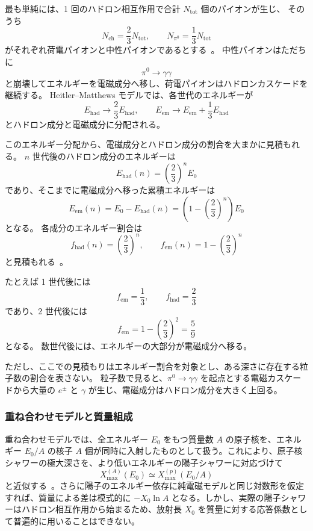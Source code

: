 \documentclass[book,paper=a4,fontsize=11pt]{jlreq}
\begin{document}
最も単純には、1 回のハドロン相互作用で合計 \(N_{\mathrm{tot}}\) 個のパイオンが生じ、
そのうち
\[
  N_{\mathrm{ch}}=\frac{2}{3}N_{\mathrm{tot}},
  \qquad
  N_{\pi^0}=\frac{1}{3}N_{\mathrm{tot}}
\]
がそれぞれ荷電パイオンと中性パイオンであるとする~\cite{Matthews2005}。
中性パイオンはただちに
\[
  \pi^0\to \gamma\gamma
\]
と崩壊してエネルギーを電磁成分へ移し、荷電パイオンはハドロンカスケードを継続する。
Heitler--Matthews モデルでは、各世代のエネルギーが
\[
  E_{\mathrm{had}}\to \frac{2}{3}E_{\mathrm{had}},
  \qquad
  E_{\mathrm{em}}\to E_{\mathrm{em}}+\frac{1}{3}E_{\mathrm{had}}
\]
とハドロン成分と電磁成分に分配される。

このエネルギー分配から、電磁成分とハドロン成分の割合を大まかに見積もれる。
\(n\) 世代後のハドロン成分のエネルギーは
\begin{equation}
  E_{\mathrm{had}}(n)=\left(\frac{2}{3}\right)^n E_0
\end{equation}
であり、そこまでに電磁成分へ移った累積エネルギーは
\begin{equation}
  E_{\mathrm{em}}(n)=E_0-E_{\mathrm{had}}(n)=\left(1-\left(\frac{2}{3}\right)^n\right)E_0
\end{equation}
となる。
各成分のエネルギー割合は
\begin{equation}
  f_{\mathrm{had}}(n)=\left(\frac{2}{3}\right)^n,
  \qquad
  f_{\mathrm{em}}(n)=1-\left(\frac{2}{3}\right)^n
\end{equation}
と見積もれる~\cite{Matthews2005,Stanev2004}。

たとえば 1 世代後には
\[
  f_{\mathrm{em}}=\frac{1}{3},
  \qquad
  f_{\mathrm{had}}=\frac{2}{3}
\]
であり、2 世代後には
\[
  f_{\mathrm{em}}=1-\left(\frac{2}{3}\right)^2=\frac{5}{9}
\]
となる。
数世代後には、エネルギーの大部分が電磁成分へ移る。

ただし、ここでの見積もりはエネルギー割合を対象とし、ある深さに存在する粒子数の割合を表さない。
粒子数で見ると、\(\pi^0\to\gamma\gamma\) を起点とする電磁カスケードから大量の \(e^\pm\) と \(\gamma\) が生じ、電磁成分はハドロン成分を大きく上回る。

\subsubsection{重ね合わせモデルと質量組成}
重ね合わせモデルでは、全エネルギー \(E_0\) をもつ質量数 \(A\) の原子核を、エネルギー \(E_0/A\) の核子 \(A\) 個が同時に入射したものとして扱う。これにより、原子核シャワーの極大深さを、より低いエネルギーの陽子シャワーに対応づけて
\begin{equation}
  X_{\max}^{(A)}(E_0)\simeq X_{\max}^{(p)}(E_0/A)
\end{equation}
と近似する~\cite{Matthews2005,Montanus2013}。さらに陽子のエネルギー依存に純電磁モデルと同じ対数形を仮定すれば、質量による差は模式的に \(-X_0\ln A\) となる。しかし、実際の陽子シャワーはハドロン相互作用から始まるため、放射長 \(X_0\) を質量に対する応答係数として普遍的に用いることはできない。
\end{document}
